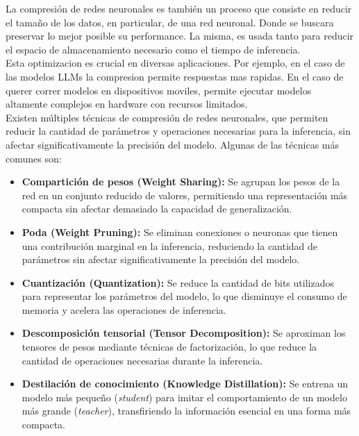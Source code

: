 La compresión de redes neuronales es también un proceso que consiste en reducir el tamaño de los datos, en particular, de una red neuronal. Donde se buscara preservar lo mejor posible su performance. La misma, es usada tanto para reducir el espacio de almacenamiento necesario como el tiempo de inferencia. \\

Esta optimizacion es crucial en diversas aplicaciones. Por ejemplo, en el caso de las modelos LLMs la compresion permite respuestas mas rapidas. En el caso de querer correr modelos en dispositivos moviles, permite ejecutar modelos altamente complejos en hardware con recursos limitados. \\

Existen múltiples técnicas de compresión de redes neuronales, que permiten reducir la cantidad de parámetros y operaciones necesarias para la inferencia, sin afectar significativamente la precisión del modelo. Algunas de las técnicas más comunes son: \\

\begin{itemize}
    \item \textbf{Compartición de pesos (Weight Sharing):} Se agrupan los pesos de la red en un conjunto reducido de valores, permitiendo una representación más compacta sin afectar demasiado la capacidad de generalización.
    \item \textbf{Poda (Weight Pruning):} Se eliminan conexiones o neuronas que tienen una contribución marginal en la inferencia, reduciendo la cantidad de parámetros sin afectar significativamente la precisión del modelo.
    \item \textbf{Cuantización (Quantization):} Se reduce la cantidad de bits utilizados para representar los parámetros del modelo, lo que disminuye el consumo de memoria y acelera las operaciones de inferencia.
    \item \textbf{Descomposición tensorial (Tensor Decomposition):} Se aproximan los tensores de pesos mediante técnicas de factorización, lo que reduce la cantidad de operaciones necesarias durante la inferencia.
    \item \textbf{Destilación de conocimiento (Knowledge Distillation):} Se entrena un modelo más pequeño (\textit{student}) para imitar el comportamiento de un modelo más grande (\textit{teacher}), transfiriendo la información esencial en una forma más compacta.
\end{itemize}
